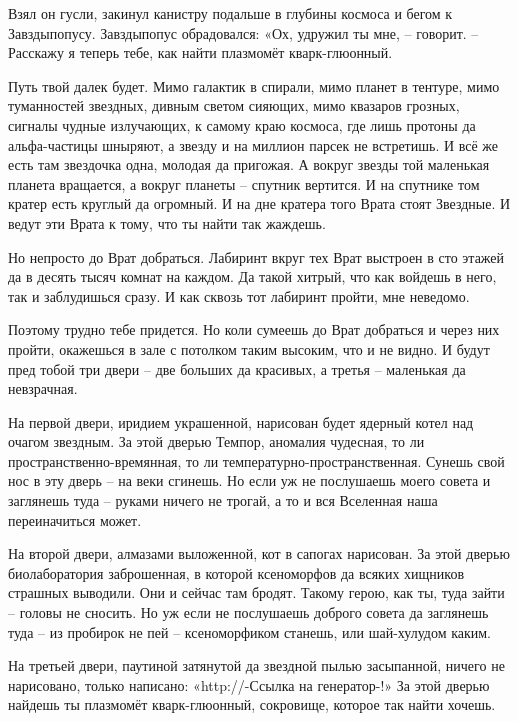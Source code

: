 \documentclass[ebook,oneside,final,openright]{memoir}
\begin{document}
Взял он гусли, закинул канистру подальше в глубины космоса и бегом к Завздыпопусу. Завздыпопус обрадовался: «Ох, удружил ты мне, – говорит. – Расскажу я теперь тебе, как найти плазмомёт кварк-глюонный.\par
\par
Путь твой далек будет. Мимо галактик в спирали, мимо планет в тентуре, мимо туманностей звездных, дивным светом сияющих, мимо квазаров грозных, сигналы чудные излучающих, к самому краю космоса, где лишь протоны да альфа-частицы шныряют, а звезду и на миллион парсек не встретишь. И всё же есть там звездочка одна, молодая да пригожая. А вокруг звезды той маленькая планета вращается, а вокруг планеты – спутник вертится. И на спутнике том кратер есть круглый да огромный. И на дне кратера того Врата стоят Звездные. И ведут эти Врата к тому, что ты найти так жаждешь.\par
\par
Но непросто до Врат добраться. Лабиринт вкруг тех Врат выстроен в сто этажей да в десять тысяч комнат на каждом. Да такой хитрый, что как войдешь в него, так и заблудишься сразу. И как сквозь тот лабиринт пройти, мне неведомо.\par
\par
Поэтому трудно тебе придется. Но коли сумеешь до Врат добраться и через них пройти, окажешься в зале с потолком таким высоким, что и не видно. И будут пред тобой три двери – две больших да красивых, а третья – маленькая да невзрачная.\par
\par
На первой двери, иридием украшенной, нарисован будет ядерный котел над очагом звездным. За этой дверью Темпор, аномалия чудесная, то ли пространственно-времянная, то ли температурно-пространственная. Сунешь свой нос в эту дверь – на веки сгинешь. Но если уж не послушаешь моего совета и заглянешь туда – руками ничего не трогай, а то и вся Вселенная наша переиначиться может.\par
\par
На второй двери, алмазами выложенной, кот в сапогах нарисован. За этой дверью биолаборатория заброшенная, в которой ксеноморфов да всяких хищников страшных выводили. Они и сейчас там бродят. Такому герою, как ты, туда зайти – головы не сносить. Но уж если не послушаешь доброго совета да заглянешь туда – из пробирок не пей – ксеноморфиком станешь, или шай-хулудом каким.\par
\par
На третьей двери, паутиной затянутой да звездной пылью засыпанной, ничего не нарисовано, только написано: «http://-Ссылка на генератор-!» За этой дверью найдешь ты плазмомёт кварк-глюонный, сокровище, которое так найти хочешь.\par
\end{document}
